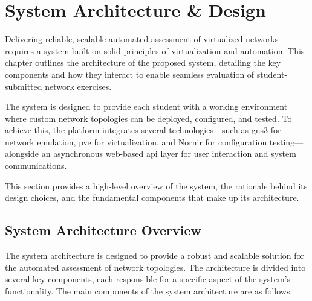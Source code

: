 
\chapter{System Architecture \& Design}


\label{ChapterSystemArchitectureDesign}


Delivering reliable, scalable automated assessment of virtualized networks requires a system built on solid principles of 
virtualization and automation. This chapter outlines the architecture of the proposed system, detailing the key components 
and how they interact to enable seamless evaluation of student-submitted network exercises.

The system is designed to provide each student with a working environment where custom network topologies can be 
deployed, configured, and tested. To achieve this, the platform integrates several technologies—such as \ac{gns3} for network 
emulation, \ac{pve} for virtualization, and Nornir for configuration testing—alongside an asynchronous web-based \ac{api} layer for 
user interaction and system communications.

This section provides a high-level overview of the system, the rationale behind its design choices, and the fundamental 
components that make up its architecture.

\section{System Architecture Overview}
The system architecture is designed to provide a robust and scalable solution for the automated assessment of network
topologies. The architecture is divided into several key components, each responsible for a specific aspect of the system's
functionality. The main components of the system architecture are as follows:


